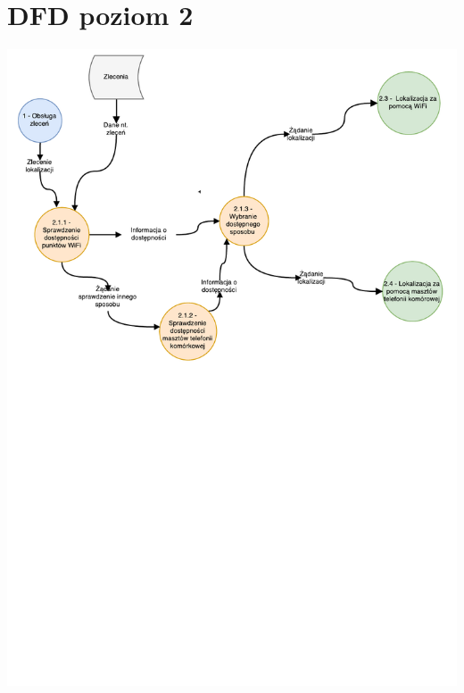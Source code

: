 \documentclass[11pt]{article}
\begin{document}
	\section{DFD poziom 2}
	\begin{center}
		\includegraphics[scale=0.8]{DFD21.pdf}
	\end{center}
	\newpage
\end{document}
